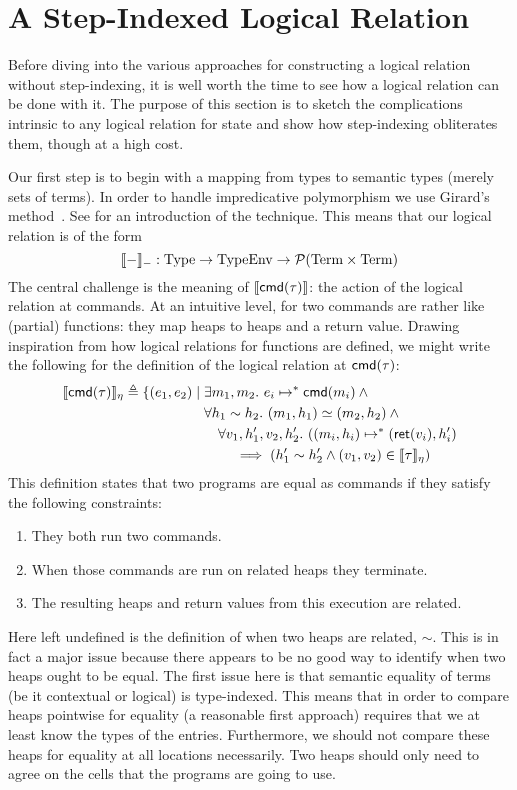 \section{A Step-Indexed Logical Relation}\label{sec:steps}

Before diving into the various approaches for constructing a logical
relation without step-indexing, it is well worth the time to see how a
logical relation can be done with it. The purpose of this section is
to sketch the complications intrinsic to any logical relation for
state and show how step-indexing obliterates them, though at a high
cost.

Our first step is to begin with a mapping from types to semantic types
(merely sets of terms). In order to handle impredicative polymorphism
we use Girard's method~\citep{Girard:71,Girard:72}. See
\citet{Harper:16} for an introduction of the technique. This means
that our logical relation is of the form
\[
  \llbracket - \rrbracket_{-} : \mathrm{Type} \to \mathrm{TypeEnv} \to \mathcal{P}(\mathrm{Term} \times \mathrm{Term})
\]
The central challenge is the meaning of $\llbracket \mathsf{cmd}(\tau) \rrbracket$: the action
of the logical relation at commands. At an intuitive level, for two
commands are rather like (partial) functions: they map heaps to heaps
and a return value. Drawing inspiration from how logical relations for
functions are defined, we might write the following for the definition
of the logical relation at $\mathsf{cmd}(\tau)$:
\begin{align*}
  \llbracket \mathsf{cmd}(\tau) \rrbracket_\eta \triangleq \{(e_1, e_2) \mid {}
  &\exists m_1, m_2.\ e_i \mapsto^* \mathsf{cmd}(m_i) \land{}\\
  &\forall h_1 \sim h_2.
  \ (m_1, h_1) \simeq (m_2, h_2) \land{}\\
  &\quad \forall v_1, h_1', v_2, h_2'.
  \ ((m_i, h_i) \mapsto^{*} (\mathsf{ret}(v_i), h_i')\\
  &\qquad \implies (h_1' \sim h_2' \land (v_1, v_2) \in \llbracket \tau \rrbracket_\eta)
\end{align*}
This definition states that two programs are equal as commands if they
satisfy the following constraints:
\begin{enumerate}
\item They both run two commands.
\item When those commands are run on related heaps they terminate.
\item The resulting heaps and return values from this execution are
  related.
\end{enumerate}
Here left undefined is the definition of when two heaps are related,
$\sim$. This is in fact a major issue because there appears to be no
good way to identify when two heaps ought to be equal. The first issue
here is that semantic equality of terms (be it contextual or logical)
is type-indexed. This means that in order to compare heaps pointwise
for equality (a reasonable first approach) requires that we at least
know the types of the entries. Furthermore, we should not compare
these heaps for equality at all locations necessarily. Two heaps
should only need to agree on the cells that the programs are going to
use.


